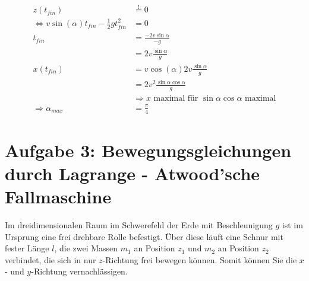 \begin{enumeralph}
	\begin{align*}
	z(t_{fin}) &\overset{!}{=} 0\\
	\Leftrightarrow v\sin(\alpha)t_{fin}-\frac{1}{2}gt_{fin}^2&=0\\
	t_{fin}&=\frac{-2v\sin\alpha}{-g}\\
	&=2v\frac{\sin\alpha}{g}\\
	x(t_{fin})&=v\cos(\alpha)2v\frac{\sin\alpha}{g}\\
	&=2v^2\frac{\sin\alpha\cos\alpha}{g}\\
	&\Rightarrow x\text{ maximal für } \sin\alpha\cos\alpha \text{ maximal}\\
	\Rightarrow \alpha_{max} &=\frac{\pi}{4}
	\end{align*}
\end{enumeralph}

\section*{Aufgabe 3: Bewegungsgleichungen durch Lagrange - Atwood'sche Fallmaschine}
Im dreidimensionalen Raum im Schwerefeld der Erde mit Beschleunigung $g$ ist im Ursprung eine frei drehbare Rolle befestigt. Über diese läuft eine Schnur mit fester Länge $l$, die zwei Massen $m_1$ an Position $z_1$ und $m_2$ an Position $z_2$ verbindet, die sich in nur $z$-Richtung frei bewegen können.  Somit können Sie die $x$- und $y$-Richtung vernachlässigen.
